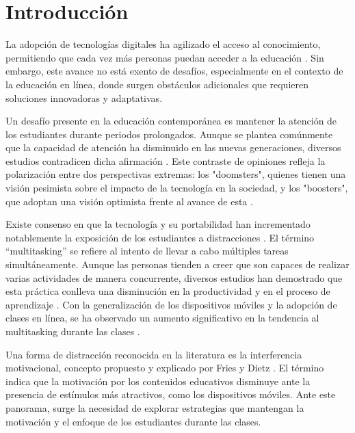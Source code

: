 \chapter{Introducción}

La adopción de tecnologías digitales ha agilizado el acceso al conocimiento, permitiendo que cada vez más personas puedan acceder a la educación \cite{UN2023ImpactDigitalTechnologies}. Sin embargo, este avance no está exento de desafíos, especialmente en el contexto de la educación en línea, donde surgen obstáculos adicionales que requieren soluciones innovadoras y adaptativas.

Un desafío presente en la educación contemporánea es mantener la atención de los estudiantes durante periodos prolongados. Aunque se plantea comúnmente que la capacidad de atención ha disminuido en las nuevas generaciones, diversos estudios contradicen dicha afirmación \cite{The_Role_of_Attention_Learning_Digital_Age}. Este contraste de opiniones refleja la polarización entre dos perspectivas extremas: los "doomsters", quienes tienen una visión pesimista sobre el impacto de la tecnología en la sociedad, y los "boosters", que adoptan una visión optimista frente al avance de esta \cite{Selwyn2014LookingF}.

Existe consenso en que la tecnología y su portabilidad han incrementado notablemente la exposición de los estudiantes a distracciones \cite{Zimmerman2011HandbookOS, Wang2022ComprehensivelySummarizeDistractions}. El término “multitasking” se refiere al intento de llevar a cabo múltiples tareas simultáneamente. Aunque las personas tienden a creer que son capaces de realizar varias actividades de manera concurrente, diversos estudios han demostrado que esta práctica conlleva una disminución en la productividad y en el proceso de aprendizaje \cite{Domoff2019AddictivePU}. Con la generalización de los dispositivos móviles y la adopción de clases en línea, se ha observado un aumento significativo en la tendencia al multitasking durante las clases \cite{Wang2022ComprehensivelySummarizeDistractions}.


Una forma de distracción reconocida en la literatura es la interferencia motivacional, concepto propuesto y explicado por Fries y Dietz \cite{Fries2007LearningMotivationalInterference}. El término indica que la motivación por los contenidos educativos disminuye ante la presencia de estímulos más atractivos, como los dispositivos móviles. Ante este panorama, surge la necesidad de explorar estrategias que mantengan la motivación y el enfoque de los estudiantes durante las clases.

